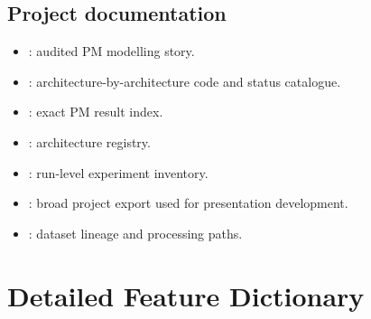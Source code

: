 \documentclass[11pt,a4paper,oneside]{report}
\begin{document}
\section{Project documentation}
\begin{itemize}
  \item {}: audited PM modelling story.
  \item {}: architecture-by-architecture
        code and status catalogue.
  \item {}: exact PM result index.
  \item {}: architecture registry.
  \item {}: run-level experiment inventory.
  \item {}: broad project
        export used for presentation development.
  \item {}: dataset lineage and processing paths.
\end{itemize}

\chapter{Detailed Feature Dictionary}
\end{document}
